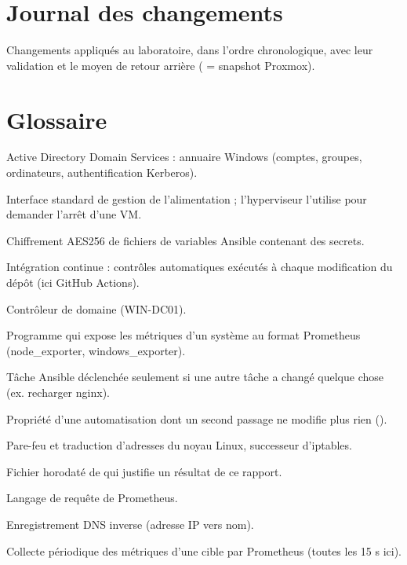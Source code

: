 \chapter{Journal des changements}\label{annexe:journal}

Changements appliqués au laboratoire, dans l'ordre chronologique, avec leur validation et le
moyen de retour arrière ( = snapshot Proxmox).

{\small}

\chapter{Glossaire}\label{annexe:glossaire}

\begin{description}[style=nextline,leftmargin=1.2cm]
  \item[AD DS] Active Directory Domain Services : annuaire Windows (comptes, groupes, ordinateurs, authentification Kerberos).
  \item[ACPI] Interface standard de gestion de l'alimentation ; l'hyperviseur l'utilise pour demander l'arrêt d'une VM.
  \item[Ansible Vault] Chiffrement AES256 de fichiers de variables Ansible contenant des secrets.
  \item[CI] Intégration continue : contrôles automatiques exécutés à chaque modification du dépôt (ici GitHub Actions).
  \item[DC] Contrôleur de domaine (WIN-DC01).
  \item[Exporter] Programme qui expose les métriques d'un système au format Prometheus (node\_exporter, windows\_exporter).
  \item[Gestionnaire (handler)] Tâche Ansible déclenchée seulement si une autre tâche a changé quelque chose (ex. recharger nginx).
  \item[Idempotence] Propriété d'une automatisation dont un second passage ne modifie plus rien ().
  \item[nftables] Pare-feu et traduction d'adresses du noyau Linux, successeur d'iptables.
  \item[Preuve P-xx] Fichier horodaté de  qui justifie un résultat de ce rapport.
  \item[PromQL] Langage de requête de Prometheus.
  \item[PTR] Enregistrement DNS inverse (adresse IP vers nom).
  \item[Scrape] Collecte périodique des métriques d'une cible par Prometheus (toutes les 15 s ici).

\end{description}
